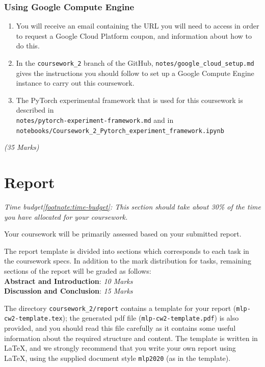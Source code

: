 \documentclass[11pt,]{article}
\begin{document}
\subsubsection*{Using Google Compute Engine}
\begin{enumerate}
    \item You will receive an email containing the URL you will need to access in order to request a Google Cloud Platform coupon, and information about how to do this.
    \item In the \texttt{coursework\_2} branch of the GitHub, \texttt{notes/google\_cloud\_setup.md} gives the instructions you should follow to set up a Google Compute Engine instance to carry out this coursework.
    \item The PyTorch experimental framework that is used for this coursework is described in\\\texttt{notes/pytorch-experiment-framework.md} and in\\\texttt{notebooks/Coursework\_2\_Pytorch\_experiment\_framework.ipynb}
\end{enumerate}

\emph{(35 Marks)}

\section{Report}
\label{sec:report}

\textit{Time budget{\cref{footnote:time-budget}}: This section should take about 30\% of the time you have allocated for your coursework.}\newline


Your coursework will be primarily assessed based on your submitted report.

The report template is divided into sections which corresponds to each task in the coursework specs. In addition to the mark distribution for tasks, remaining sections of the report will be graded as follows: \\
\textbf{Abstract and Introduction}: \emph{10 Marks}\\
\textbf{Discussion and Conclusion}: \emph{15 Marks}



The directory \verb+coursework_2/report+ contains a template for your report (\verb+mlp-cw2-template.tex+);  the generated pdf file (\verb+mlp-cw2-template.pdf+) is also provided, and you should read this file carefully as it contains some useful information about the required structure and content. The template is written in LaTeX, and we strongly recommend that you write your own report using LaTeX, using the supplied document style \verb+mlp2020+ (as in the template).
\end{document}
